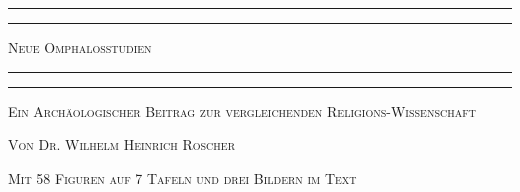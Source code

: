 \documentclass[a4paper, 11pt, oneside]{article}
\begin{document}
\renewcommand\thefootnote{{\bfseries\color{BrickRed}{\arabic{footnote}}}}
\let\oldfootnote\footnote
    \renewcommand{\footnote}[1]{\oldfootnote{{\normalsize\bfseries\color{BrickRed}#1}}}
\begin{titlepage} %
	\centering %

	
	\rule{\textwidth}{1.6pt}\vspace*{-\baselineskip}\vspace*{2pt} %
	\rule{\textwidth}{0.4pt} %
	
	\vspace{1\baselineskip} %
	
	{\scshape\Huge Neue Omphalosstudien}
	
	\vspace{1\baselineskip} %

	\rule{\textwidth}{0.4pt}\vspace*{-\baselineskip}\vspace{3.2pt} %
	\rule{\textwidth}{1.6pt} %
	
	\vspace{1\baselineskip} %
	
	
	{\scshape Ein Archäologischer Beitrag zur vergleichenden Religions-Wissenschaft} %
	
	\vspace*{1\baselineskip} %

        {\scshape Von \Large Dr. Wilhelm Heinrich Roscher}

	\vspace*{2\baselineskip} %

        {\scshape\small Mit 58 Figuren auf 7 Tafeln und drei Bildern im Text}

	\vspace{1\baselineskip}

        \vspace*{\fill}


\end{titlepage}
\end{document}
